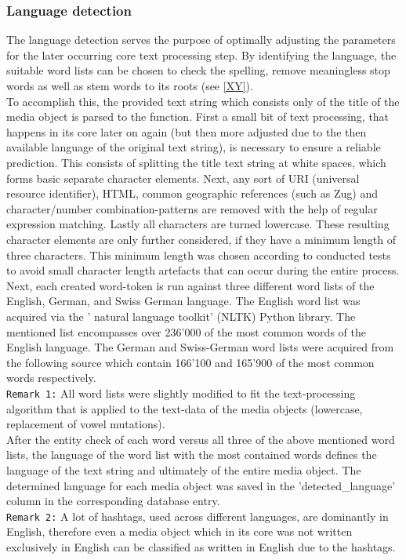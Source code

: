 \subsubsection{Language detection} \label{langauge_detection}
The language detection serves the purpose of optimally adjusting the parameters for the later occurring core text processing step. By identifying the language, the suitable word lists can be chosen to check the spelling, remove meaningless stop words as well as stem words to its roots (see \ref{XY}).\\
\newline
To accomplish this, the provided text string which consists only of the title of the media object is parsed to the function. First a small bit of text processing, that happens in its core later on again (but then more adjusted due to the then available language of the original text string), is necessary to ensure a reliable prediction. This consists of splitting the title text string at white spaces, which forms basic separate character elements. Next, any sort of URI (universal resource identifier), HTML, common geographic references (such as Zug) and character/number combination-patterns are removed with the help of regular expression matching. Lastly all characters are turned lowercase. These resulting character elements are only further considered, if they have a minimum length of three characters. This minimum length was chosen according to conducted tests to avoid small character length artefacts that can occur during the entire process.\\
Next, each created word-token is run against three different word lists of the English, German, and Swiss German language.
The English word list was acquired via the ' natural language toolkit' (NLTK) Python library. The mentioned list encompasses over 236'000 of the most common words of the English language.
The German and Swiss-German word lists were acquired from the following source \cite{GeooffwicksWordLanguages} which contain 166'100 and 165'900  of the most common words respectively.\\
\newline
\texttt{Remark 1:} All word lists were slightly modified to fit the text-processing algorithm that is applied to the text-data of the media objects (lowercase, replacement of vowel mutations).\\
\newline
After the entity check of each word versus all three of the above mentioned word lists, the language of the word list with the most contained words defines the language of the text string and ultimately of the entire media object. The determined language for each media object was saved in the 'detected\_language' column in the corresponding database entry.\\
\newline
\texttt{Remark 2:} A lot of hashtags, used across different languages, are dominantly in English, therefore even a media object which in its core was not written exclusively in English can be classified as written in English due to the hashtags.

